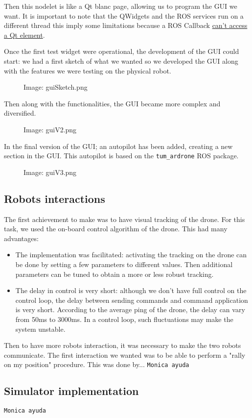 \documentclass[11pt,a4paper]{article}
\newcommand{\centerImage}[1]{
	\begin{figure}[h]
	\centering
	Image: #1
	\end{figure}
}
\newcommand{\Monica}{\texttt{Monica ayuda}}
\begin{document}
Then this nodelet is like a Qt blanc page, allowing us to program the GUI we want. It is 
important to note that the QWidgets and the ROS services run on a different thread this 
imply some limitations because a ROS Callback
\href{http://wiki.ros.org/rqt/Tutorials/Writing\%20a\%20C\%2B\%2B\%20Plugin}
{can't access a Qt element}.

Once the first test widget were operational, the development of the GUI could start: we had a 
first sketch of what we wanted so we developed the GUI along with the features we were
testing on the physical robot.
\centerImage{guiSketch.png}

Then along with the functionalities, the GUI became more complex and diversified.
\centerImage{guiV2.png}

In the final version of the GUI; an autopilot has been added, creating a new section in the 
GUI. This autopilot is based on the \verb!tum_ardrone! ROS package.
\centerImage{guiV3.png}

\subsection{Robots interactions}
The first achievement to make was to have visual tracking of the drone. For this task, we used 
the on-board control algorithm of the drone. This had many advantages: 
\begin{itemize}
\item The implementation was facilitated: activating the tracking on the drone can be done by 
setting a few parameters to different values. Then additional parameters can be tuned to
obtain a more or less robust tracking.
\item The delay in control is very short: although we don't have full control on the control
loop, the delay between sending commands and command application is very short. According to
the average ping of the drone, the delay can vary from 50ms to 3000ms. In a control loop,
such fluctuations may make the system unstable.
\end{itemize}

Then to have more robots interaction, it was necessary to make the two robots communicate.
The first interaction we wanted was to be able to perform a "rally on my position" procedure.
This was done by...  \Monica

\subsection{Simulator implementation}
\Monica
\end{document}

